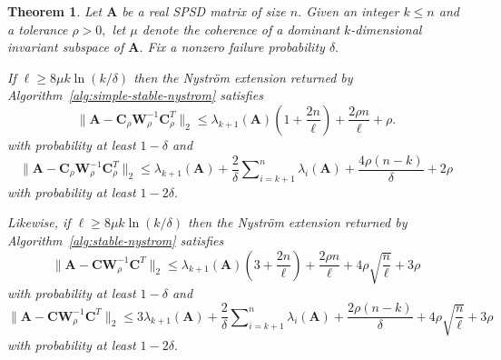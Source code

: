 \documentclass[11pt,letterpaper,twoside,reqno,nosumlimits]{amsart}
\def\transp{T}
\newcommand{\mat}[1]{\ensuremath{\mathbf{#1}}}
\newcommand{\snorm}[1]{\ensuremath{\big\|#1\big\|_2}}
\newtheorem{thm}{Theorem}
\theoremstyle{remark}
\begin{document}
\begin{thm}
 Let $\mat{A}$ be a real SPSD matrix of size $n.$ Given an integer $k \leq n$ and a tolerance $\rho >0,$ let
$\mu$ denote the coherence of a dominant  $k$-dimensional invariant subspace of $\mat{A}.$
Fix a nonzero failure probability $\delta.$ 

If $\ell \geq 8 \mu k \ln(k/\delta)$ then the Nystr\"om extension returned by Algorithm~\ref{alg:simple-stable-nystrom} satisfies 
\[
  \snorm{\mat{A} - \mat{C}_\rho\mat{W}_\rho^{-1} \mat{C}_\rho^\transp } \leq \lambda_{k+1}(\mat{A})\left(1 + \frac{2n}{\ell}\right) + \frac{2 \rho n}{\ell} + \rho.
\]
with probability at least $1- \delta$ and
\[
 \snorm{\mat{A} - \mat{C}_\rho\mat{W}_\rho^{-1} \mat{C}_\rho^\transp } \leq \lambda_{k+1}(\mat{A}) + \frac{2}{\delta} \sum\nolimits_{i=k+1}^n \lambda_i(\mat{A}) + \frac{4\rho (n-k)}{\delta} + 2\rho
\]
with probability at least $1 - 2\delta.$

Likewise, if $\ell \geq 8 \mu k \ln(k/\delta)$ then the Nystr\"om extension returned by Algorithm~\ref{alg:stable-nystrom} satisfies
\[
  \snorm{\mat{A} - \mat{C}\mat{W}_\rho^{-1} \mat{C}^\transp } \leq \lambda_{k+1}(\mat{A}) \left(3 + \frac{2n}{\ell}\right) + \frac{2 \rho n}{\ell} + 4\rho\sqrt{\frac{ n}{\ell}} + 3\rho
\]
with probability at least $1- \delta$ and
\[
 \snorm{\mat{A} - \mat{C}\mat{W}_\rho^{-1} \mat{C}^\transp } \leq 3 \lambda_{k+1}(\mat{A}) + \frac{2}{\delta} \sum\nolimits_{i=k+1}^n \lambda_i(\mat{A}) + \frac{2 \rho (n-k)}{\delta} + 4\rho\sqrt{\frac{n}{\ell}} + 3\rho
\]
with probability at least $1 - 2\delta.$
\label{thm:stabilized-nystrom-error-bounds}
\end{thm}
\end{document}
